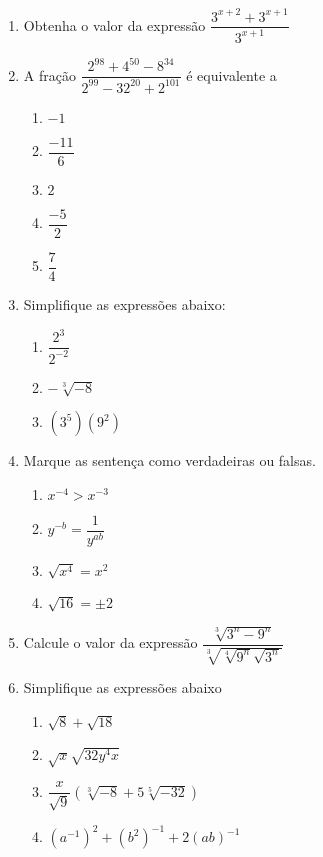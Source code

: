     \begin{enumerate}

		\item Obtenha o valor da expressão $\dfrac{3^{x+2} + 3^{x+1}}{3^{x+1}}$
		
		\item A fração $\dfrac{2^{98}+4^{50}-8^{34}}{2^{99}-32^{20}+2^{101}}$ é equivalente a 
		\begin{enumerate}
			\item $-1$
			\item $\dfrac{-11}{6}$
			\item $2$
			\item $\dfrac{-5}{2}$
			\item $\dfrac{7}{4}$
		\end{enumerate}
		
		\item Simplifique as expressões abaixo:
		\begin{enumerate}
			\item $\dfrac{2^3}{2^{-2}}$
			\item $-\sqrt[3]{-8}$
			\item $(3^5)(9^2)$
		\end{enumerate}
		
		\item Marque as sentença como verdadeiras ou falsas.
		\begin{enumerate}
			\item \text{[ \;\;]} $x^{-4} > x^{-3}$
			\item \text{[ \;\;]} $y^{-b} = \dfrac{1}{y^{ab}}$
			\item \text{[ \;\;]} $\sqrt{x^4} = x^2$
			\item \text{[ \;\;]} $\sqrt{16} = \pm 2$
		\end{enumerate}
		
		\item Calcule o valor da expressão $\dfrac{\sqrt[3]{3^n-9^n}}{\sqrt[3]{\sqrt[4]{9^n} \sqrt{3^n}}}$
		
		\item Simplifique as expressões abaixo 
		\begin{enumerate}
			\item $\sqrt{8} + \sqrt{18}$
			\item $\sqrt{x} \sqrt{32 y^{4} x}$
			\item $\dfrac{x}{\sqrt{9}}(\sqrt[3]{-8} + 5 \sqrt[5]{-32})$
			\item $ (a^{-1})^2 + (b^2)^{-1} +2(ab)^{-1}$
		\end{enumerate}
	\end{enumerate}
	
